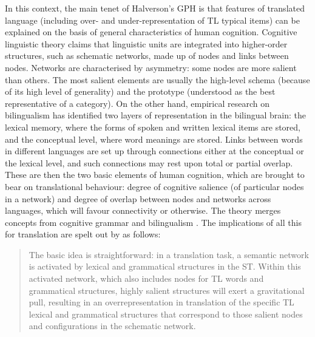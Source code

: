 \documentclass[output=paper,english,spanish,german,english]{langsci/langscibook}
\begin{document}
In this context, the main tenet of Halverson’s GPH is that features of translated language (including over- and under-representation of TL typical items) can be explained on the basis of general characteristics of human cognition. Cognitive linguistic theory claims that linguistic units are integrated into higher-order structures, such as schematic networks, made up of nodes and links between nodes. Networks are characterised by asymmetry: some nodes are more salient than others. The most salient elements are usually the high-level schema (because of its high level of generality) and the prototype (understood as the best representative of a category). On the other hand, empirical research on bilingualism has identified two layers of representation in the bilingual brain: the lexical memory, where the forms of spoken and written lexical items are stored, and the conceptual level, where word meanings are stored. Links between words in different languages are set up through connections either at the conceptual or the lexical level, and such connections may rest upon total or partial overlap. These are then the two basic elements of human cognition, which are brought to bear on translational behaviour: degree of cognitive salience (of particular nodes in a network) and degree of overlap between nodes and networks across languages, which will favour connectivity or otherwise. The theory merges concepts from cognitive grammar \parencite[especially][]{langacker87} and bilingualism \parencites{degroot92opmm}{degroot92ep}. The implications of all this for translation are spelt out by \citet[218]{halverson03} as follows:

\begin{quote}
The basic idea is straightforward: in a translation task, a semantic network is activated by lexical and grammatical structures in the ST. Within this activated network, which also includes nodes for TL words and grammatical structures, highly salient structures will exert a gravitational pull, resulting in an overrepresentation in translation of the specific TL lexical and grammatical structures that correspond to those salient nodes and configurations in the schematic network.
\end{quote}
\end{document}

